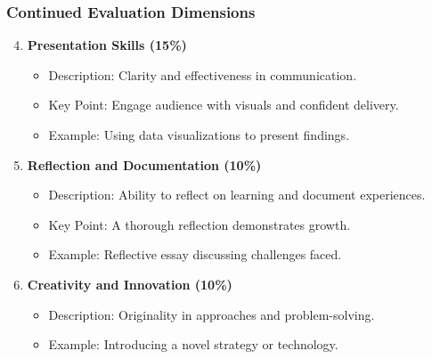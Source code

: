 \documentclass[aspectratio=169]{beamer}
\begin{document}
\begin{frame}[fragile]
    \frametitle{Continued Evaluation Dimensions}
    \begin{enumerate}
        \setcounter{enumi}{3}
        \item \textbf{Presentation Skills (15\%)}
            \begin{itemize}
                \item Description: Clarity and effectiveness in communication.
                \item Key Point: Engage audience with visuals and confident delivery.
                \item Example: Using data visualizations to present findings.
            \end{itemize}
            
        \item \textbf{Reflection and Documentation (10\%)}
            \begin{itemize}
                \item Description: Ability to reflect on learning and document experiences.
                \item Key Point: A thorough reflection demonstrates growth.
                \item Example: Reflective essay discussing challenges faced.
            \end{itemize}
            
        \item \textbf{Creativity and Innovation (10\%)}
            \begin{itemize}
                \item Description: Originality in approaches and problem-solving.
                \item Example: Introducing a novel strategy or technology.
            \end{itemize}
    \end{enumerate}
\end{frame}
\end{document}
